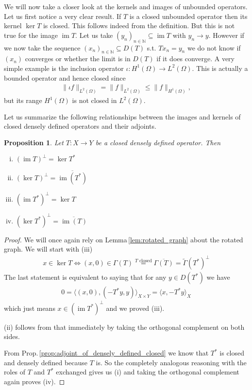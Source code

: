 \documentclass[12pt,a4paper]{article}
\numberwithin{equation}{subsection}
\numberwithin{lemma}{subsection}
\newtheorem{proposition}[lemma]{Proposition}
\theoremstyle{definition}
\DeclareMathOperator{\Ima}{im}
\newcommand{\naturalnum}{\mathbb{N}}
\begin{document}
We will now take a closer look at the kernels and images of unbounded operators.
Let us first notice a very clear result. If $T$ is a closed unbounded operator 
then its kernel $\ker T$ is closed. This follows indeed from the definition. 
But this is not true for the image $\Ima T$. Let us take
$(y_n)_{n \in \naturalnum} \subseteq \Ima T$ with $y_n \rightarrow y$.
However if we now take the sequence $(x_n)_{n \in \naturalnum} \subseteq D(T)$
s.t. $Tx_n = y_n$ we do not know if $(x_n)$ converges or 
whether the limit is in $D(T)$ if it does converge. 
A very simple example is the inclusion operator
$\iota: H^1(\Omega) \rightarrow L^2(\Omega)$. This is actually a bounded 
operator and hence closed since 
\begin{align*}
    \lVert \iota f \rVert _{L^2(\Omega)} 
    = \lVert f \rVert _{L^2(\Omega)} 
    \leq \lVert f \rVert _{H^1(\Omega)},
\end{align*}
but its range $H^1(\Omega)$ is not closed in $L^2(\Omega)$.

Let us summarize the following relationships between the images and kernels 
of closed densely defined operators and their adjoints.

\begin{proposition}\label{prop:kernel_image_adjoint}
    Let $T: X \rightarrow Y$ be a closed densely defined operator. Then
    \begin{enumerate}[(i)]
        \item $(\Ima T)^\perp = \ker T^*$
        \item $(\ker T)^\perp = \overline{\Ima(T^*)}$
        \item $(\Ima T^*)^\perp = \ker T$
        \item $(\ker T^*)^\perp = \overline{\Ima(T)}$
    \end{enumerate}
\end{proposition}
\begin{proof}
    We will once again rely on Lemma\,\ref{lem:rotated_graph} about the 
    rotated graph. We will start with (iii)
    \begin{align*}
        x \in \ker T \Leftrightarrow (x,0) \in \Gamma(T) 
        \stackrel{\text{$T$ closed}}{=} \overline{\Gamma(T)} 
        = \tilde{\Gamma}(T^*)^\perp 
    \end{align*}
    The last statement is equivalent to saying that for any $y \in D(T^*)$ 
    we have 
    \begin{align*}
        0 = \langle (x,0), (-T^*y,y) \rangle_{X \times Y}
        = \langle x, -T^*y \rangle_X
    \end{align*}
    which just means $x \in (\Ima T^*)^\perp$ and we proved (iii).

    (ii) follows from that immediately by taking the orthogonal complement 
    on both sides.

    From Prop.\,\ref{prop:adjoint_of_densely_defined_closed} 
    we know that $T^*$ is closed and densely defined because $T$
    is. So the completely analogous reasoning with the roles of $T$ and $T^*$
    exchanged gives us (i) and taking the orthogonal complement again 
    proves (iv).
\end{proof}
\end{document}
